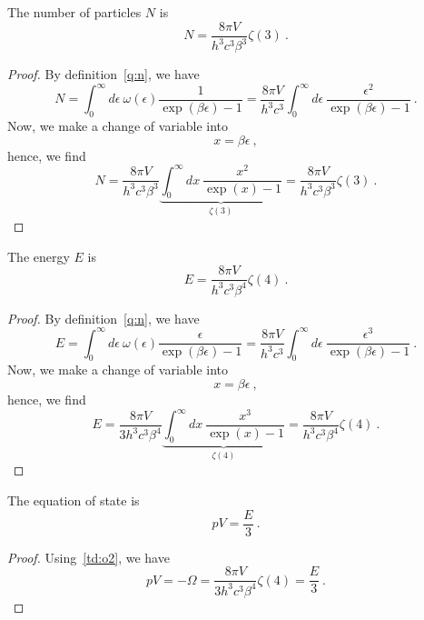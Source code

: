     The number of particles $N$ is 
    \begin{equation*}
        N = \frac{8 \pi V}{h^3 c^3 \beta^3} \zeta(3) ~.
    \end{equation*}
    \begin{proof}
        By definition~\eqref{q:n}, we have 
        \begin{equation}
            N = \int_0^\infty d\epsilon ~ \omega(\epsilon) \frac{1}{\exp(\beta \epsilon) - 1} = \frac{8 \pi V}{h^3 c^3} \int_0^\infty d\epsilon ~ \frac{\epsilon^2}{\exp(\beta \epsilon) - 1} ~.
        \end{equation}
        Now, we make a change of variable into 
        \begin{equation}
            x = \beta \epsilon ~,
        \end{equation}
        hence, we find 
        \begin{equation*}
            N = \frac{8 \pi V}{h^3 c^3 \beta^3} \underbrace{\int_0^\infty dx ~ \frac{x^2}{\exp(x) - 1}}_{\zeta(3)} = \frac{8 \pi V}{h^3 c^3 \beta^3} \zeta(3) ~.
        \end{equation*}
    \end{proof}
    The energy $E$ is 
    \begin{equation*}
        E = \frac{8 \pi V}{h^3 c^3 \beta^4} \zeta(4) ~.
    \end{equation*}
    \begin{proof}
        By definition~\eqref{q:n}, we have 
        \begin{equation}
            E = \int_0^\infty d\epsilon ~ \omega(\epsilon) \frac{\epsilon}{\exp(\beta \epsilon) - 1} = \frac{8 \pi V}{h^3 c^3} \int_0^\infty d\epsilon ~ \frac{\epsilon^3}{\exp(\beta \epsilon) - 1} ~.
        \end{equation}
        Now, we make a change of variable into 
        \begin{equation}
            x = \beta \epsilon ~,
        \end{equation}
        hence, we find 
        \begin{equation*}
            E = \frac{8 \pi V}{3 h^3 c^3 \beta^4} \underbrace{\int_0^\infty dx ~ \frac{x^3}{\exp(x) - 1}}_{\zeta(4)} = \frac{8 \pi V}{h^3 c^3 \beta^4} \zeta(4) ~.
        \end{equation*}
    \end{proof}
    The equation of state is 
    \begin{equation}
        pV = \frac{E}{3} ~.
    \end{equation}
    \begin{proof}
        Using~\eqref{td:o2}, we have 
        \begin{equation*}
            p V = - \Omega = \frac{8 \pi V}{3 h^3 c^3 \beta^4} \zeta(4) = \frac{E}{3} ~.
        \end{equation*}
    \end{proof}

